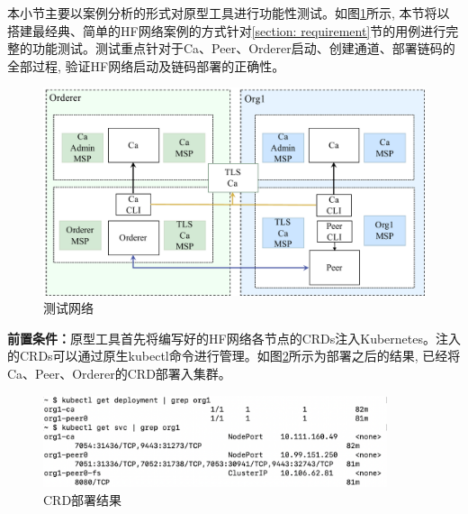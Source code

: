 本小节主要以案例分析的形式对原型工具进行功能性测试。如图\ref{fabric_net}所示, 本节将以搭建最经典、简单的HF网络案例的方式针对\ref{section: requirement}节的用例进行完整的功能测试。测试重点针对于Ca、Peer、Orderer启动、创建通道、部署链码的全部过程, 验证HF网络启动及链码部署的正确性。

\begin{figure}[h] %
    \centering %
    \includegraphics[width=1.0\textwidth]{FIGs/chapter5/fabric_net.pdf} %
    \caption{测试网络} %
    \label{fabric_net} %
\end{figure}%

\textbf{前置条件：}原型工具首先将编写好的HF网络各节点的CRDs注入Kubernetes。注入的CRDs可以通过原生kubectl命令进行管理。如图\ref{crdresult}所示为部署之后的结果, 已经将Ca、Peer、Orderer的CRD部署入集群。

\begin{figure}[h] %
    \centering %
    \includegraphics[width=0.9\textwidth]{FIGs/chapter5/peer.png} %
    \caption{CRD部署结果} %
    \label{crdresult} %
\end{figure}%

